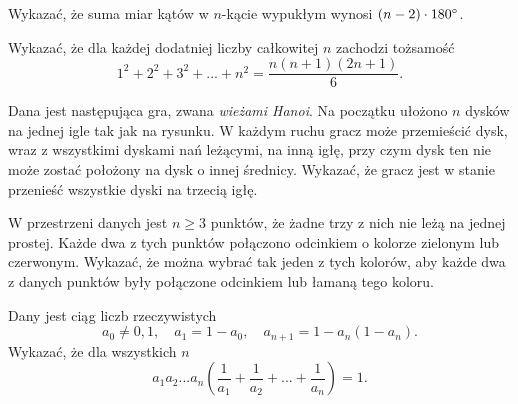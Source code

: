 \begin{problem}{1} 
	Wykazać, że suma miar kątów w $n$-kącie wypukłym wynosi ${(n - 2) \cdot 180\degree}$.
\end{problem}

\begin{problem}{2} 
 Wykazać, że dla każdej dodatniej liczby całkowitej $n$ zachodzi tożsamość
\[
	1^2 + 2^2 + 3^2 + ... + n^2 = \frac{n(n + 1)(2n + 1)}{6}.
\]
\end{problem}

\begin{problem}{3} 
Dana jest następująca gra, zwana \textit{wieżami Hanoi}. Na początku ułożono $n$ dysków na jednej igle tak jak na rysunku. W każdym ruchu gracz może przemieścić dysk, wraz z wszystkimi dyskami nań leżącymi, na inną igłę, przy czym dysk ten nie może zostać położony na dysk o innej średnicy. Wykazać, że gracz jest w stanie przenieść wszystkie dyski na trzecią igłę.

\begin{center}

\end{center}

\end{problem}

\begin{problem}{4}
	W przestrzeni danych jest $n \geqslant 3$ punktów, że żadne trzy z nich nie leżą na jednej prostej. Każde dwa z tych punktów połączono odcinkiem o kolorze zielonym lub czerwonym. Wykazać, że można wybrać tak jeden z tych kolorów, aby każde dwa z danych punktów były połączone odcinkiem lub łamaną tego koloru.
\end{problem}

\begin{problem}{5} 
Dany jest ciąg liczb rzeczywistych
\[
	a_0 \neq 0, 1,\quad a_1 = 1 - a_0,\quad a_{n + 1} = 1 - a_n(1 - a_n). 
\]
Wykazać, że dla wszystkich $n$ 
\[
	a_1a_2...a_n\left(\frac{1}{a_1} + \frac{1}{a_2} + ... + \frac{1}{a_n}\right) = 1.
\]
\end{problem}

